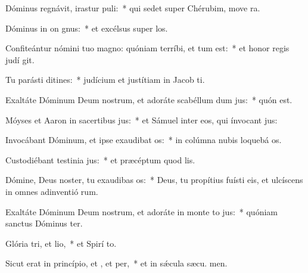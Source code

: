 \item Dóminus regnávit, irastur puli:~* qui sedet super Chérubim, move ra.
\item Dóminus in on gnus:~* et excélsus super  los.
\item Confiteántur nómini tuo magno: quóniam terríbi, et tum est:~* et honor regis judí git.
\item Tu parásti ditines:~* judícium et justítiam in Jacob  ti.
\item Exaltáte Dóminum Deum nostrum, et adoráte scabéllum dum jus:~* quón  est.
\item Móyses et Aaron in sacertibus jus:~* et Sámuel inter eos, qui ínvocant  jus:
\item Invocábant Dóminum, et ipse exaudibat os:~* in colúmna nubis loquebá  os.
\item Custodiébant testinia jus:~* et præcéptum quod  lis.
\item Dómine, Deus noster, tu exaudibas os:~* Deus, tu propítius fuísti eis, et ulcíscens in omnes adinventió rum.
\item Exaltáte Dóminum Deum nostrum, et adoráte in monte to jus:~* quóniam sanctus Dóminus  ter.
\item Glória tri, et lio,~* et Spirí to.
\item Sicut erat in princípio, et , et per,~* et in sǽcula sæcu. men.
